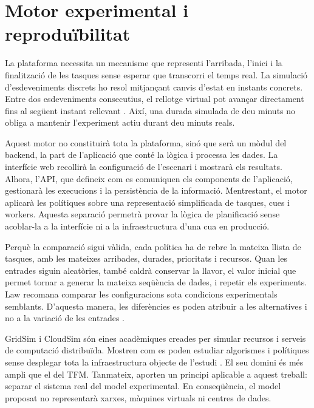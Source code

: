 \section{Motor experimental i reproduïbilitat}

La plataforma necessita un mecanisme que representi l'arribada, l'inici i la
finalització de les tasques sense esperar que transcorri el temps real. La
simulació d'esdeveniments discrets ho resol mitjançant canvis d'estat en
instants concrets. Entre dos esdeveniments consecutius, el rellotge virtual pot
avançar directament fins al següent instant rellevant
\parencite{banks2010des,simpyTime}. Així, una durada simulada de deu minuts no
obliga a mantenir l'experiment actiu durant deu minuts reals.

Aquest motor no constituirà tota la plataforma, sinó que serà un mòdul del
backend, la part de l'aplicació que conté la lògica i processa les dades. La
interfície web recollirà la configuració de l'escenari i mostrarà els resultats.
Alhora, l'API, que defineix com es comuniquen els components de l'aplicació,
gestionarà les execucions i la persistència de la informació. Mentrestant, el
motor aplicarà les polítiques sobre una representació simplificada de tasques,
cues i workers. Aquesta separació permetrà provar la lògica de planificació
sense acoblar-la a la interfície ni a la infraestructura d'una cua en producció.

Perquè la comparació sigui vàlida, cada política ha de rebre la mateixa llista
de tasques, amb les mateixes arribades, durades, prioritats i recursos. Quan les
entrades siguin aleatòries, també caldrà conservar la llavor, el valor inicial
que permet tornar a generar la mateixa seqüència de dades, i repetir els
experiments. Law recomana comparar les configuracions sota condicions
experimentals semblants. D'aquesta manera, les diferències es poden atribuir a
les alternatives i no a la variació de les entrades
\parencite{law2015simulation}.

GridSim i CloudSim són eines acadèmiques creades per simular recursos i serveis
de computació distribuïda. Mostren com es poden estudiar algorismes i polítiques
sense desplegar tota la infraestructura objecte de l'estudi
\parencite{buyya2002gridsim,calheiros2011cloudsim}. El seu domini és més ampli
que el del TFM. Tanmateix, aporten un principi aplicable a aquest treball:
separar el sistema real del model experimental. En conseqüència, el model
proposat no representarà xarxes, màquines virtuals ni centres de dades.

